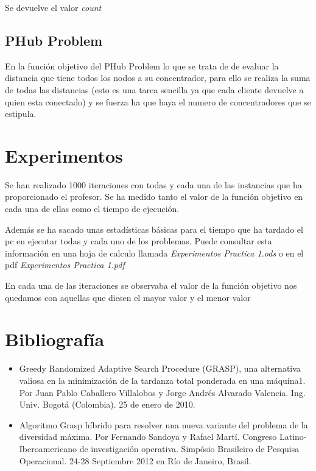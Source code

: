 \documentclass[12pt,a4paper,draft,openany]{article}
\begin{document}
Se devuelve el valor \emph{count}

\subsection{PHub Problem}
En la función objetivo del PHub Problem lo que se trata de de evaluar la distancia que tiene todos los nodos a su concentrador, para ello se realiza la suma de todas las distancias (esto es una tarea sencilla ya que cada cliente devuelve a quien esta conectado) y se fuerza ha que haya el numero de concentradores que se estipula.

\section{Experimentos}
Se han realizado 1000 iteraciones con todas y cada una de las instancias que ha proporcionado el profesor. Se ha medido tanto el valor de la función objetivo en cada una de ellas como el tiempo de ejecución.

Además se ha sacado unas estadísticas básicas para el tiempo que ha tardado el pc en ejecutar todas y cada uno de los problemas. Puede consultar esta información en una hoja de calculo llamada \emph{Experimentos Practica 1.ods} o en el pdf \emph{Experimentos Practica 1.pdf}

En cada una de las iteraciones se observaba el valor de la función objetivo nos quedamos con
aquellas que diesen el mayor valor y el menor valor

\section*{Bibliografía}
\begin{itemize}
\item Greedy Randomized Adaptive Search
Procedure (GRASP), una alternativa
valiosa en la minimización de la tardanza
total ponderada en una máquina1. Por Juan Pablo Caballero Villalobos y Jorge Andrés Alvarado Valencia. Ing. Univ. Bogotá (Colombia). 25 de enero de 2010.

\item Algoritmo Grasp híbrido para resolver una nueva variante del problema de la diversidad máxima. Por Fernando Sandoya y Rafael Martí. Congreso Latino-Iberoamericano de investigación operativa. Simpósio Brasileiro de Pesquisa Operacional. 24-28 Septiembre 2012 en Río de Janeiro, Brasil.


\end{itemize}
\end{document}

